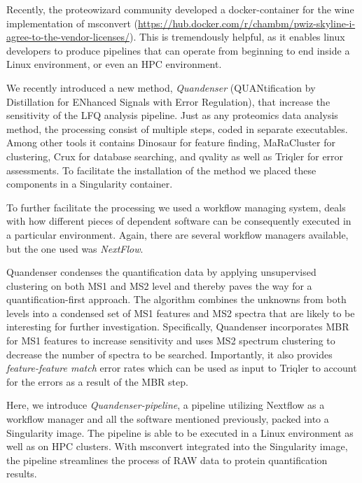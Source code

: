 \documentclass[11pt]{article}
\begin{document}
Recently, the proteowizard community developed a docker-container for the wine implementation of msconvert (\url{https://hub.docker.com/r/chambm/pwiz-skyline-i-agree-to-the-vendor-licenses/}). This is tremendously helpful, as it enables linux developers to produce pipelines that can operate from beginning to end inside a Linux environment, or even an HPC environment.

We recently introduced a new method, {\em Quandenser} (QUANtification by Distillation for ENhanced Signals with Error Regulation), that increase the sensitivity of the LFQ analysis pipeline\cite{quandenser}. Just as any proteomics data analysis method, the processing consist of multiple steps, coded in separate executables. Among other tools it contains Dinosaur\cite{teleman2016dinosaur} for feature finding, MaRaCluster\cite{the2016maracluster} for clustering, Crux\cite{mcilwain2014} for database searching, and qvality\cite{kall2008non} as well as Triqler\cite{the2018integrated} for error assessments. To facilitate the installation of the method we placed these components in a Singularity container.

To further facilitate the processing we used a workflow managing system, deals with how different pieces of dependent software can be consequently executed in a particular environment. Again, there are several workflow managers available, but the one used was \textit{NextFlow}\cite{di2017nextflow}.

Quandenser condenses the quantification data by applying unsupervised clustering on both MS1 and MS2 level and thereby paves the way for a quantification-first approach. The algorithm combines the unknowns from both levels into a condensed set of MS1 features and MS2 spectra that are likely to be interesting for further investigation. Specifically, Quandenser incorporates MBR for MS1 features to increase sensitivity and uses MS2 spectrum clustering to decrease the number of spectra to be searched. Importantly, it also provides {\em feature-feature match} error rates which can be used as input to Triqler to account for the errors as a result of the MBR step.

Here, we introduce \textit{Quandenser-pipeline}, a pipeline utilizing Nextflow as a workflow manager and all the software mentioned previously, packed into a Singularity image. The pipeline is able to be executed in a Linux environment as well as on HPC clusters. With msconvert integrated into the Singularity image, the pipeline streamlines the process of RAW data to protein quantification results.
\end{document}
